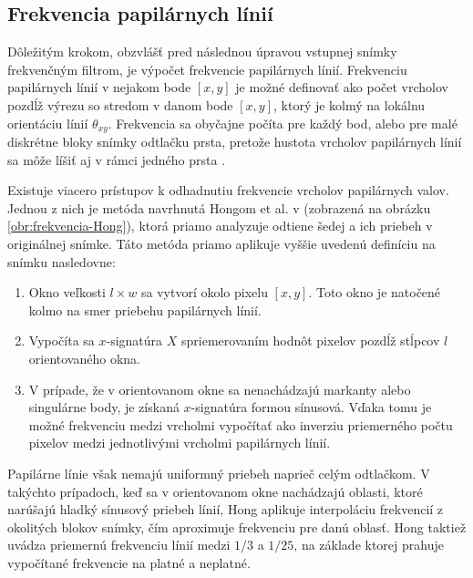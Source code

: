   \subsection{Frekvencia papilárnych línií}
  Dôležitým krokom, obzvlášť pred následnou úpravou vstupnej snímky frekvenčným filtrom, je výpočet frekvencie papilárnych línií.
  Frekvenciu papilárnych línií v nejakom bode $[x,y]$ je možné definovať ako počet vrcholov pozdĺž výrezu so stredom v danom bode $[x,y]$,
  ktorý je kolmý na lokálnu orientáciu línií $\theta_{xy}$. Frekvencia sa obyčajne počíta pre každý bod, alebo pre malé diskrétne bloky snímky odtlačku prsta,
  pretože hustota vrcholov papilárnych línií sa môže líšiť aj v rámci jedného prsta \cite{Handbook}.

  Existuje viacero prístupov k odhadnutiu frekvencie vrcholov papilárnych valov. Jednou z nich je metóda navrhnutá Hongom et al. v \cite{Hong} (zobrazená na
  obrázku \ref{obr:frekvencia-Hong}),
  ktorá priamo analyzuje odtiene šedej a ich priebeh v originálnej snímke. Táto metóda priamo aplikuje vyššie uvedenú definíciu na snímku nasledovne:

  \begin{enumerate}
    \item Okno veľkosti $l \times{} w$ sa vytvorí okolo pixelu $[x,y]$. Toto okno je natočené kolmo na smer priebehu papilárnych línií.
    \item Vypočíta sa $x$-signatúra $X$ spriemerovaním hodnôt pixelov pozdĺž stĺpcov $l$ orientovaného okna.
    \item V prípade, že v orientovanom okne sa nenachádzajú markanty alebo singulárne body, je získaná $x$-signatúra formou sínusová. Vďaka tomu je
          možné frekvenciu medzi vrcholmi vypočítať ako inverziu priemerného počtu pixelov medzi jednotlivými vrcholmi papilárnych línií.
  \end{enumerate}
  Papilárne línie však nemajú uniformný priebeh naprieč celým odtlačkom. V takýchto prípadoch, keď sa v orientovanom okne nachádzajú oblasti, ktoré narúšajú
  hladký sínusový priebeh línií, Hong aplikuje interpoláciu frekvencií z okolitých blokov snímky, čím aproximuje frekvenciu pre danú oblasť. Hong taktiež uvádza
  priemernú frekvenciu línií medzi $1/3$ a $1/25$, na základe ktorej prahuje vypočítané frekvencie na platné a neplatné.

